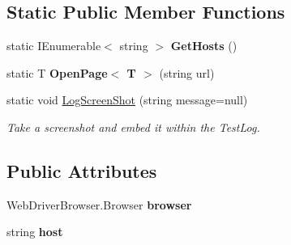 \subsection*{Static Public Member Functions}
\begin{DoxyCompactItemize}
\item 
\hypertarget{class_proto_test_1_1_golem_1_1_web_driver_1_1_web_driver_test_base_a8df3582f08d20973d40af0012b008547}{static I\-Enumerable$<$ string $>$ {\bfseries Get\-Hosts} ()}\label{class_proto_test_1_1_golem_1_1_web_driver_1_1_web_driver_test_base_a8df3582f08d20973d40af0012b008547}

\item 
\hypertarget{class_proto_test_1_1_golem_1_1_web_driver_1_1_web_driver_test_base_ad96821757fa7641319247cc4df8b2795}{static T {\bfseries Open\-Page$<$ T $>$} (string url)}\label{class_proto_test_1_1_golem_1_1_web_driver_1_1_web_driver_test_base_ad96821757fa7641319247cc4df8b2795}

\item 
static void \hyperlink{class_proto_test_1_1_golem_1_1_web_driver_1_1_web_driver_test_base_a5c4e7f33a4296d7455bd91d9c96be1aa}{Log\-Screen\-Shot} (string message=null)
\begin{DoxyCompactList}\small\item\em Take a screenshot and embed it within the Test\-Log. \end{DoxyCompactList}\end{DoxyCompactItemize}
\subsection*{Public Attributes}
\begin{DoxyCompactItemize}
\item 
\hypertarget{class_proto_test_1_1_golem_1_1_web_driver_1_1_web_driver_test_base_a529f64e79b025e51fd0753d97784d02b}{Web\-Driver\-Browser.\-Browser {\bfseries browser}}\label{class_proto_test_1_1_golem_1_1_web_driver_1_1_web_driver_test_base_a529f64e79b025e51fd0753d97784d02b}

\item 
\hypertarget{class_proto_test_1_1_golem_1_1_web_driver_1_1_web_driver_test_base_a39ac05d0f672dd9764b3e44e7c15650d}{string {\bfseries host}}\label{class_proto_test_1_1_golem_1_1_web_driver_1_1_web_driver_test_base_a39ac05d0f672dd9764b3e44e7c15650d}

\end{DoxyCompactItemize}
